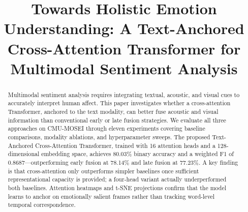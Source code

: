 \documentclass[conference]{IEEEtran}
\begin{document}
\title{Towards Holistic Emotion Understanding: A Text-Anchored Cross-Attention Transformer for Multimodal Sentiment Analysis}

\author{
\and
{}
}


\maketitle

\begin{abstract}
Multimodal sentiment analysis requires integrating textual, acoustic, and visual cues to accurately interpret human affect. This paper investigates whether a cross-attention Transformer, anchored to the text modality, can better fuse acoustic and visual information than conventional early or late fusion strategies. We evaluate all three approaches on CMU-MOSEI through eleven experiments covering baseline comparisons, modality ablations, and hyperparameter sweeps. The proposed Text-Anchored Cross-Attention Transformer, trained with 16 attention heads and a 128-dimensional embedding space, achieves 80.03\% binary accuracy and a weighted F1 of 0.8687---outperforming early fusion at 78.14\% and late fusion at 77.23\%. A key finding is that cross-attention only outperforms simpler baselines once sufficient representational capacity is provided; a four-head variant actually underperformed both baselines. Attention heatmaps and t-SNE projections confirm that the model learns to anchor on emotionally salient frames rather than tracking word-level temporal correspondence.
\end{abstract}
\end{document}
